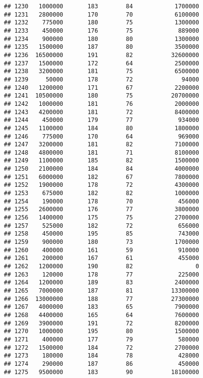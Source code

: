 \documentclass[
]{article}
\begin{document}
\begin{verbatim}
## 1230   1000000       183        84            1700000
## 1231   2800000       170        70            6100000
## 1232    775000       180        75            1300000
## 1233    450000       176        75             889000
## 1234    900000       180        80            1300000
## 1235   1500000       187        80            3500000
## 1236  16500000       191        82           32600000
## 1237   1500000       172        64            2500000
## 1238   3200000       181        75            6500000
## 1239     50000       178        72              94000
## 1240   1200000       171        67            2200000
## 1241  10500000       180        75           20700000
## 1242   1000000       181        76            2000000
## 1243   4200000       181        72            8400000
## 1244    450000       179        77             934000
## 1245   1100000       184        80            1800000
## 1246    775000       170        64             969000
## 1247   3200000       181        82            7100000
## 1248   4800000       181        71            8100000
## 1249   1100000       185        82            1500000
## 1250   2100000       184        84            4000000
## 1251   6000000       182        67            7800000
## 1252   1900000       178        72            4300000
## 1253    675000       182        82            1000000
## 1254    190000       178        70             456000
## 1255   2600000       176        77            3800000
## 1256   1400000       175        75            2700000
## 1257    525000       182        72             656000
## 1258    450000       195        85             743000
## 1259    900000       180        73            1700000
## 1260    400000       161        59             910000
## 1261    200000       167        61             455000
## 1262   1200000       190        82                  0
## 1263    120000       178        77             225000
## 1264   1200000       189        83            2400000
## 1265   7000000       187        81           13300000
## 1266  13000000       188        77           27300000
## 1267   4000000       183        65            7900000
## 1268   4400000       165        64            7600000
## 1269   3900000       191        72            8200000
## 1270   1000000       195        80            1500000
## 1271    400000       177        79             580000
## 1272   1500000       184        72            2700000
## 1273    180000       184        78             428000
## 1274    290000       187        86             450000
## 1275   9500000       183        90           18100000

\end{verbatim}
\end{document}

